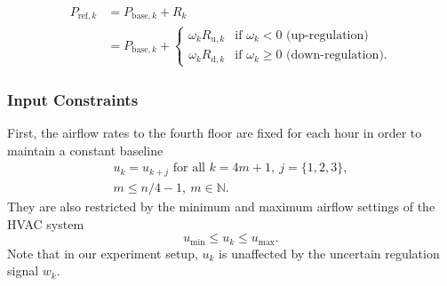 \begin{equation}\label{eq:P_ref}
\begin{aligned}
P_{\text{ref},k} &= P_{\text{base},k}+R_k \\
	&= P_{\text{base},k}+\begin{cases}
	\omega_k R_{\text{u},k} & \mbox{if } \omega_k < 0 \mbox{ (up-regulation)} \\ 
	\omega_k R_{\text{d},k} & \mbox{if } \omega_k \geq 0 \mbox{ (down-regulation).} 
	\end{cases} 
\end{aligned}
\end{equation}



\subsubsection{Input Constraints}


First, the airflow rates to the fourth floor are fixed for each hour in order to maintain a constant baseline
\begin{multline}\label{eq:u_constraint_const}
u_k = u_{k+j} \text{~for all~} k = 4m+1,~ j = \{1,2,3\}, \\
m \leq n/4-1, ~m \in \mathbb{N}.
\end{multline}
They are also restricted by the minimum and maximum airflow settings of the HVAC system
\begin{equation}\label{eq:u_constraint}
u_{\text{min}} \leq u_{k} \leq u_{\text{max}}.
\end{equation}
Note that in our experiment setup, $u_k$ is unaffected by the uncertain regulation signal $w_k$.


